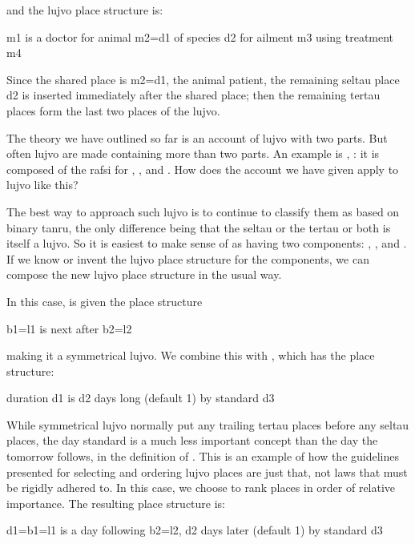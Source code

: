 {\noindent}and the lujvo place structure is:
\begin{example}
m1 is a doctor for animal m2=d1 of species d2\n
\T	for ailment m3 using treatment m4
\end{example}

Since the shared place is m2=d1, the animal patient, the
    remaining seltau place d2 is inserted immediately after the
    shared place; then the remaining tertau places form the last
    two places of the lujvo.



The theory we have outlined so far is an account of lujvo
    with two parts. But often lujvo are made containing more than
    two parts. An example is , : it is
    composed of the rafsi for , , and
    . How does the account we have given apply to lujvo like
    this?

The best way to approach such lujvo is to continue to
    classify them as based on binary tanru, the only difference
    being that the seltau or the tertau or both is itself a lujvo.
    So it is easiest to make sense of  as having two
    components: , , and . If we know or
    invent the lujvo place structure for the components, we can
    compose the new lujvo place structure in the usual way.

In this case,  is given the place structure
\begin{example}
b1=l1 is next after b2=l2
\end{example}

{\noindent}making it a symmetrical lujvo. We combine this with ,
    which has the place structure:
\begin{example}
duration d1 is d2 days long (default 1)\n
\T	by standard d3
\end{example}

While symmetrical lujvo normally put any trailing tertau places
    before any seltau places, the day standard is a much less
    important concept than the day the tomorrow follows, in the
    definition of . This is an example of how the
    guidelines presented for selecting and ordering lujvo places
    are just that, not laws that must be rigidly adhered to. In
    this case, we choose to rank places in order of relative
    importance. The resulting place structure is:
\begin{example}
d1=b1=l1 is a day following b2=l2,\n
\T	d2 days later (default 1) by standard d3
\end{example}

